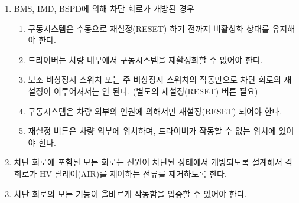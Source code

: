 \documentclass[final,a4paper,10pt]{report}
\begin{document}
\begin{enumerate}
  \item\label{rule:formula-technical.shutdown-circuit.bms-imd-bspd-triggered} BMS, IMD, BSPD에 의해 차단 회로가 개방된 경우 \label{item:차단 회로 개방}
    \begin{enumerate}
      \item\label{rule:formula-technical.shutdown-circuit.bms-imd-bspd-triggered.disabled-until-manual-reset} 구동시스템은 수동으로 재설정(RESET) 하기 전까지 비활성화 상태를 유지해야 한다.
      \item\label{rule:formula-technical.shutdown-circuit.bms-imd-bspd-triggered.no-driver-reactivation} 드라이버는 차량 내부에서 구동시스템을 재활성화할 수 없어야 한다.
      \item\label{rule:formula-technical.shutdown-circuit.bms-imd-bspd-triggered.dedicated-reset-button} 보조 비상정지 스위치 또는 주 비상정지 스위치의 작동만으로 차단 회로의 재설정이 이루어져서는 안 된다. (별도의 재설정(RESET) 버튼 필요)
      \item\label{rule:formula-technical.shutdown-circuit.bms-imd-bspd-triggered.reset-by-outside-person} 구동시스템은 차량 외부의 인원에 의해서만 재설정(RESET) 되어야 한다.
      \item\label{rule:formula-technical.shutdown-circuit.bms-imd-bspd-triggered.reset-button-driver-unreachable} 재설정 버튼은 차량 외부에 위치하며, 드라이버가 작동할 수 없는 위치에 있어야 한다.
    \end{enumerate}

  \item\label{rule:formula-technical.shutdown-circuit.normally-open-fail-safe} 차단 회로에 포함된 모든 회로는 전원이 차단된 상태에서 개방되도록 설계해서 각 회로가 HV 릴레이(AIR)를 제어하는 전류를 제거하도록 한다. \label{item:차단 회로 전원 차단}
  \item\label{rule:formula-technical.shutdown-circuit.functional-verification} 차단 회로의 모든 기능이 올바르게 작동함을 입증할 수 있어야 한다. \label{item:차단 회로 입증}
\end{enumerate}
\end{document}
